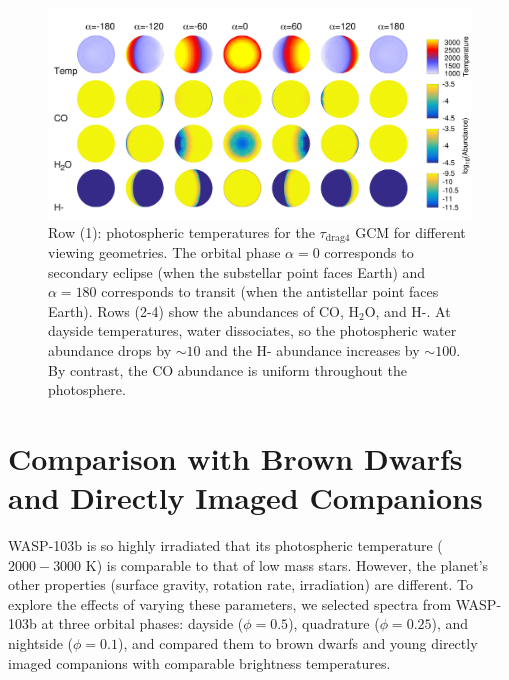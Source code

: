 \documentclass[twocolumn]{aastex61}
\begin{document}
\begin{figure}
	\includegraphics[width = 1.0\textwidth]{fig15.pdf}
	\caption{Row (1): photospheric temperatures for the $\tau_\mathrm{drag4}$ GCM for different viewing geometries.  The orbital phase $\alpha=0$ corresponds to secondary eclipse (when the substellar point faces Earth) and $\alpha=180$ corresponds to transit (when the antistellar point faces Earth). Rows (2-4) show the abundances of CO, H$_2$O, and H-. At dayside temperatures, water dissociates, so the photospheric water abundance drops by $\sim10$ and the H- abundance increases by $\sim100$. By contrast, the CO abundance is uniform throughout the photosphere.}
\label{fig:GCMabundance}
\end{figure}

\section{Comparison with Brown Dwarfs and Directly Imaged Companions}
\label{sec:comparison}
WASP-103b is so highly irradiated that its photospheric temperature ($2000 - 3000$ K) is comparable to that of low mass stars. However, the planet's other properties (surface gravity, rotation rate, irradiation) are different. To explore the effects of varying these parameters, we selected spectra from WASP-103b at three orbital phases: dayside ($\phi = 0.5$), quadrature ($\phi = 0.25$), and nightside ($\phi = 0.1$), and compared them to brown dwarfs and young directly imaged companions with comparable brightness temperatures.
\end{document}
